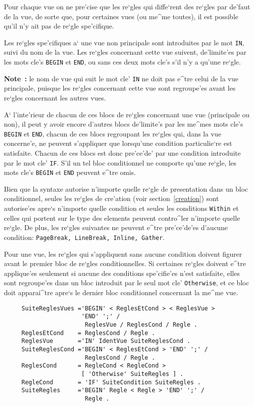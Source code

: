 {Pour chaque vue on ne pre'cise que les re`gles qui diffe`rent des re`gles
par de'faut de la vue, de sorte que, pour certaines vues (ou me^me toutes),
il est possible qu'il n'y ait pas de re`gle spe'cifique.

\label{instrin}
Les re`gles spe'cifiques a` une vue non principale sont introduites par le
mot {\tt IN}, suivi du nom de la vue. Les re`gles concernant cette vue
suivent, de'limite'es par les mots cle's {\tt BEGIN} et {\tt END}, ou sans
ces deux mots cle's s'il n'y a qu'une re`gle.

{\bf Note~:} le nom de vue qui suit le mot cle' {\tt IN} ne doit pas e^tre
celui de la vue principale, puisque les re`gles concernant cette vue sont
regroupe'es avant les re`gles concernant les autres vues.

A` l'inte'rieur de chacun de ces blocs de re`gles concernant une vue
(principale ou non), il peut y avoir encore d'autres blocs de'limite's
par les me^mes mots cle's {\tt BEGIN} et {\tt END}, chacun de ces
blocs regroupant les re`gles qui, dans la vue concerne'e, ne peuvent
s'appliquer que lorsqu'une condition particulie`re est satisfaite.
Chacun de ces blocs est donc pre'ce'de' par une condition introduite
par le mot cle' {\tt IF}. S'il un tel bloc conditionnel ne comporte
qu'une re`gle, les mots cle's {\tt BEGIN} et {\tt END} peuvent e^tre
omis.

Bien que la syntaxe autorise n'importe quelle re`gle de presentation
dans un bloc conditionnel, seules les re`gles de cre'ation (voir
section~\ref{creation}) sont autorise'es apre`s n'importe quelle
condition et seules les conditions {\tt Within} et celles qui portent
sur le type des elements peuvent contro^ler
n'importe quelle re`gle. De plus, les re`gles suivantes ne peuvent
e^tre pre'ce'de'es d'aucune condition:
{\tt PageBreak, LineBreak, Inline, Gather}.

Pour une vue, les re`gles qui s'appliquent sans aucune condition doivent
figurer avant le premier bloc de re`gles conditionnelles. Si certaines
re`gles doivent e^tre applique'es seulement si aucune des conditions
spe'cifie'es n'est satisfaite, elles sont regroupe'es dans un bloc
introduit par le seul mot cle' {\tt Otherwise}, et ce bloc doit apparai^tre
apre`s le dernier bloc conditionnel concernant la me^me vue.

\begin{verbatim}
     SuiteReglesVues ='BEGIN' < ReglesEtCond > < ReglesVue >
                      'END' ';' /
                       ReglesVue / ReglesCond / Regle .
     ReglesEtCond    = ReglesCond / Regle .
     ReglesVue       ='IN' IdentVue SuiteReglesCond .
     SuiteReglesCond ='BEGIN' < ReglesEtCond > 'END' ';' /
                       ReglesCond / Regle .
     ReglesCond      = RegleCond < RegleCond >
                      [ 'Otherwise' SuiteRegles ] .
     RegleCond       = 'IF' SuiteCondition SuiteRegles .
     SuiteRegles     ='BEGIN' Regle < Regle > 'END' ';' /
                       Regle .
\end{verbatim}

}
